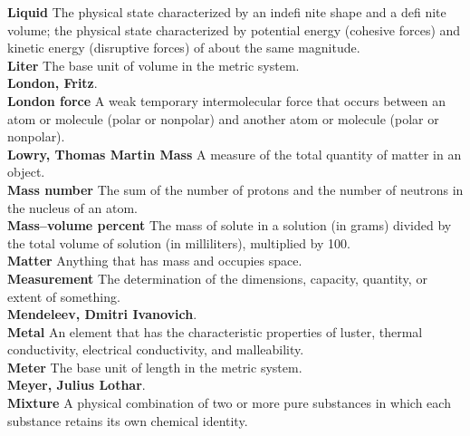 \documentclass[10pt, roman]{article}
\begin{document}
\begin{minipage}[c]{0.30\textwidth}
\textbf{Liquid} The physical state characterized by an indefi nite shape and a defi nite volume; the physical state characterized by potential energy (cohesive forces) and kinetic energy (disruptive forces) of about the same magnitude. \\
\textbf{Liter} The base unit of volume in the metric system. \\
\textbf{London, Fritz}. \\
\textbf{London force} A weak temporary intermolecular force that occurs between an atom or molecule (polar or nonpolar) and another atom or molecule (polar or nonpolar). \\
\textbf{Lowry, Thomas Martin Mass} A measure of the total quantity of matter in an object. \\
\textbf{Mass number} The sum of the number of protons and the number of neutrons in the nucleus of an atom. \\
\textbf{Mass–volume percent} The mass of solute in a solution (in grams) divided by the total volume of solution (in milliliters), multiplied by 100. \\
\textbf{Matter} Anything that has mass and occupies space. \\
\textbf{Measurement} The determination of the dimensions, capacity, quantity, or extent of something. \\
\textbf{Mendeleev, Dmitri Ivanovich}. \\
\textbf{Metal} An element that has the characteristic properties of luster, thermal conductivity, electrical conductivity, and malleability. \\
\textbf{Meter} The base unit of length in the metric system. \\
\textbf{Meyer, Julius Lothar}. \\
\textbf{Mixture} A physical combination of two or more pure substances in which each substance retains its own chemical identity. \\
\end{minipage}%
\newpage
\end{document}
